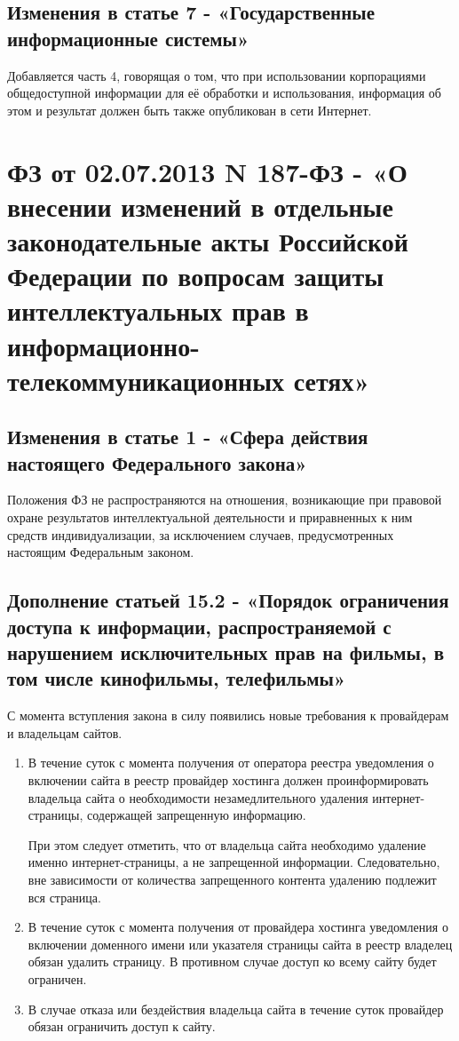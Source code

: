\documentclass[14pt,a4paper,report]{article}
\begin{document}
\subsection{Изменения в статье 7 - «Государственные информационные системы»}
Добавляется часть 4, говорящая о том, что при использовании корпорациями общедоступной информации для её обработки и использования, информация об этом и результат должен быть также опубликован в сети Интернет.

\section{ФЗ от 02.07.2013 N 187-ФЗ - «О внесении изменений в отдельные законодательные акты Российской Федерации по вопросам защиты интеллектуальных прав в информационно-телекоммуникационных сетях»}

\subsection{Изменения в статье 1 - «Сфера действия настоящего Федерального закона»}
Положения ФЗ не распространяются на отношения, возникающие при правовой охране результатов интеллектуальной деятельности и приравненных к ним средств индивидуализации, за исключением случаев, предусмотренных настоящим Федеральным законом.

\subsection{Дополнение статьей 15.2 - «Порядок ограничения доступа к информации, распространяемой с нарушением исключительных прав на фильмы, в том числе кинофильмы, телефильмы»}

С момента вступления закона в силу появились новые требования к провайдерам и владельцам сайтов. 
\begin{enumerate}

	\item В течение суток с момента получения от оператора реестра уведомления о включении сайта в реестр провайдер хостинга должен проинформировать владельца сайта о необходимости незамедлительного удаления интернет-страницы, содержащей запрещенную информацию.
	
	При этом следует отметить, что от владельца сайта необходимо удаление именно интернет-страницы, а не запрещенной информации. Следовательно, вне зависимости от количества запрещенного контента удалению подлежит вся страница.
	
	\item В течение суток с момента получения от провайдера хостинга уведомления о включении доменного имени или указателя страницы сайта в реестр владелец обязан удалить страницу. В противном случае доступ ко всему сайту будет ограничен.
	
	\item В случае отказа или бездействия владельца сайта в течение суток провайдер обязан ограничить доступ к сайту.
\end{enumerate}
\end{document}
